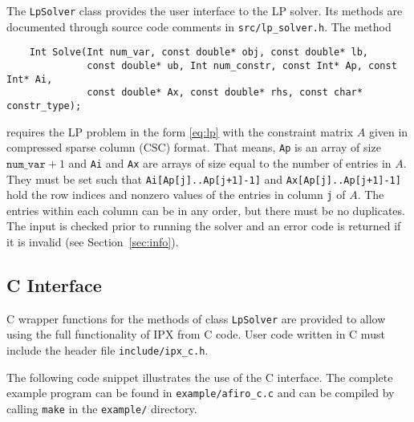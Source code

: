 \documentclass{article}
\newcommand{\ct}{\texttt}
\begin{document}
The \ct{LpSolver} class provides the user interface to the LP solver. Its
methods are documented through source code comments in \ct{src/lp\_solver.h}.
The method
\begin{verbatim}
    Int Solve(Int num_var, const double* obj, const double* lb,
              const double* ub, Int num_constr, const Int* Ap, const Int* Ai,
              const double* Ax, const double* rhs, const char* constr_type);
\end{verbatim}
requires the LP problem in the form \eqref{eq:lp} with the constraint matrix $A$
given in compressed sparse column (CSC) format. That means, \ct{Ap} is an array
of size $\ct{num\_var}+1$ and \ct{Ai} and \ct{Ax} are arrays of size equal to
the number of entries in $A$. They must be set such that
\ct{Ai[Ap[j]..Ap[j+1]-1]} and \ct{Ax[Ap[j]..Ap[j+1]-1]} hold the row indices and
nonzero values of the entries in column \ct{j} of $A$. The entries within each
column can be in any order, but there must be no duplicates. The input is
checked prior to running the solver and an error code is returned if it is
invalid (see Section~\ref{sec:info}).

\subsection{C Interface}
C wrapper functions for the methods of class \ct{LpSolver} are provided to allow
using the full functionality of IPX from C code. User code written in C must
include the header file \ct{include/ipx\_c.h}.

The following code snippet illustrates the use of the C interface. The
complete example program can be found in \ct{example/afiro\_c.c} and can be
compiled by calling \ct{make} in the \ct{example/} directory.
\end{document}
